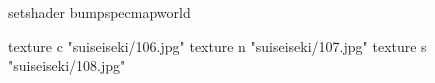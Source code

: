setshader bumpspecmapworld

    texture c "suiseiseki/106.jpg"
    texture n "suiseiseki/107.jpg"
    texture s "suiseiseki/108.jpg"
